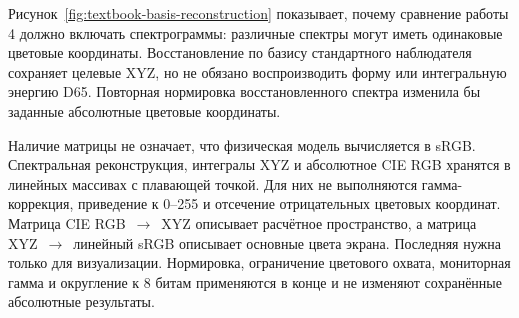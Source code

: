 Рисунок~\ref{fig:textbook-basis-reconstruction} показывает, почему сравнение работы 4 должно включать спектрограммы: различные спектры могут иметь одинаковые цветовые координаты. Восстановление по базису стандартного наблюдателя сохраняет целевые XYZ, но не обязано воспроизводить форму или интегральную энергию D65. Повторная нормировка восстановленного спектра изменила бы заданные абсолютные цветовые координаты.

Наличие матрицы  не означает, что физическая модель вычисляется в sRGB. Спектральная реконструкция, интегралы XYZ и абсолютное CIE RGB хранятся в линейных массивах с плавающей точкой. Для них не выполняются гамма-коррекция, приведение к 0--255 и отсечение отрицательных цветовых координат. Матрица CIE RGB~$\to$~XYZ описывает расчётное пространство, а матрица XYZ~$\to$~линейный sRGB описывает основные цвета экрана. Последняя нужна только для визуализации. Нормировка, ограничение цветового охвата, мониторная гамма и округление к 8 битам применяются в конце и не изменяют сохранённые абсолютные результаты.
